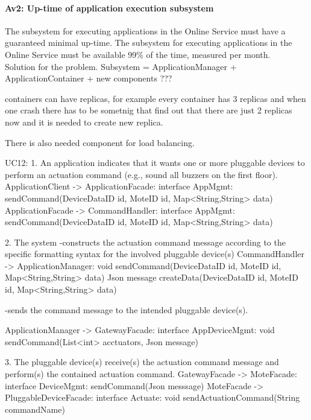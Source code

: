     \paragraph{Av2: Up-time of application execution subsystem}
        The subsystem for executing applications in the Online Service must
        have a guaranteed minimal up-time. The subsystem for executing
        applications in the Online Service must be available
        99\% of the time, measured per month. \\
        Solution for the problem.
        Subsystem = ApplicationManager + ApplicationContainer + new components ???
        
        containers can have replicas, for example every container has 3 replicas and 
        when one crash  there has to be sometnig that find out that there are 
        just 2 replicas now and it is needed to create new replica.
        
        There is also needed component for load balancing.
        
        UC12:
            1. An application indicates that it wants one or more pluggable devices 
            to perform an actuation command (e.g., sound all buzzers on the first floor).
            ApplicationClient -> ApplicationFacade: interface AppMgmt: sendCommand(DeviceDataID id, MoteID id, Map<String,String> data) 
            ApplicationFacade -> CommandHandler: interface AppMgmt: sendCommand(DeviceDataID id, MoteID id, Map<String,String> data)
            
            2. The system 
                -constructs the actuation command message according to the specific formatting syntax
                for the involved pluggable device(s)
                CommandHandler -> ApplicationManager: 
                                                void sendCommand(DeviceDataID id, MoteID id, Map<String,String> data)
                                                   Json message createData(DeviceDataID id, MoteID id, Map<String,String> data)
                                                     
                -sends the command message to the intended pluggable device(s).
                    
                    ApplicationManager -> GatewayFacade: interface AppDeviceMgmt: 
                                                            void sendCommand(List<int> acctuators, Json message)
            
            3. The pluggable device(s) receive(s) the actuation command message
               and perform(s) the contained actuation command.
                    GatewayFacade -> MoteFacade: interface DeviceMgmt: sendCommand(Json messsage)
                    MoteFacade -> PluggableDeviceFacade: interface Actuate: 
                                                            void sendActuationCommand(String commandName)
            
